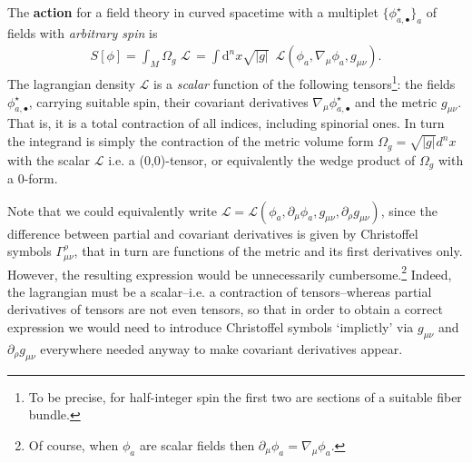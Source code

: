 \documentclass[../geometry_main.tex]{subfiles}
\begin{document}
\begin{mytheorem}
%
The \textbf{action} for a field theory in curved spacetime with a multiplet $\{\phi^\star_{a,\bullet}\}_a$ of fields with \emph{arbitrary spin} is 
\begin{align}\label{eq:general_matter_lagrangian}
    S[\phi] =  \int_M \Omega_g\,\,\mathcal{L}\,=\int \mathrm{d}^n x \sqrt{|g|} \,\,\, \mathcal{L}(\phi_a, \nabla_\mu \phi_a, g_{\mu\nu}).
\end{align}
The lagrangian density $\mathcal{L}$ is a \emph{scalar} function of the following tensors\footnote{To be precise, for half-integer spin the first two are sections of a suitable fiber bundle.}: the fields $\phi^\star_{a,\bullet}$, carrying suitable spin, their covariant derivatives $\nabla_\mu \phi^\star_{a,\bullet}$ and the metric $g_{\mu\nu}$.
That is, it is a total contraction of all indices, including spinorial ones.
In turn the integrand is simply the contraction of the metric volume form $\Omega_g = \sqrt{|g|} d^n x$ with the scalar $\mathcal{L}$ i.e. a (0,0)-tensor, or equivalently the wedge product of $\Omega_g$ with a 0-form.

Note that we could equivalently write $\mathcal{L}=\mathcal{L}(\phi_a, \partial_\mu \phi_a, g_{\mu\nu},\partial_\rho g_{\mu\nu})$, since the difference between partial and covariant derivatives is given by Christoffel symbols $\Gamma_{\mu\nu}^\rho$, that in turn are functions of the metric and its first derivatives only.
However, the resulting expression would be unnecessarily cumbersome.\footnote{Of course, when $\phi_a$ are scalar fields then $\partial_\mu\phi_a=\nabla_\mu\phi_a$.} Indeed, the lagrangian must be a scalar--i.e. a contraction of tensors--whereas partial derivatives of tensors are not even tensors, so that in order to obtain a correct expression we would need to introduce Christoffel symbols `implictly' via $g_{\mu\nu}$ and $\partial_\rho g_{\mu\nu}$ everywhere needed anyway to make covariant derivatives appear.


\end{mytheorem}
\end{document}
